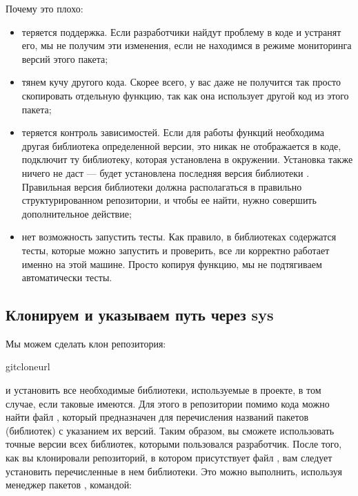 \documentclass[letterpaper,10pt,russian]{sphinxmanual}
\begin{document}
\sphinxAtStartPar
Почему это плохо:
\begin{itemize}
\item {} 
\sphinxAtStartPar
теряется поддержка. Если разработчики найдут проблему в коде и устранят его, мы не получим эти изменения, если не находимся в режиме мониторинга версий этого пакета;

\item {} 
\sphinxAtStartPar
тянем кучу другого кода. Скорее всего, у вас даже не получится так просто скопировать отдельную функцию, так как она использует другой код из этого пакета;

\item {} 
\sphinxAtStartPar
теряется контроль зависимостей. Если для работы функций необходима другая библиотека определенной версии, это никак не отображается в коде,  подключит ту библиотеку, которая установлена в окружении. Установка  также ничего не даст — будет установлена последняя версия библиотеки . Правильная версия библиотеки должна располагаться в правильно структурированном репозитории, и чтобы ее найти, нужно совершить дополнительное действие;

\item {} 
\sphinxAtStartPar
нет возможность запустить тесты. Как правило, в библиотеках содержатся тесты, которые можно запустить и проверить, все ли корректно работает именно на этой машине. Просто копируя функцию, мы не подтягиваем автоматически тесты.

\end{itemize}


\subsection{Клонируем и указываем путь через sys}
\label{\detokenize{educational_materials/packaging/content:sys}}
\sphinxAtStartPar
Мы можем сделать клон репозитория:

\begin{sphinxVerbatim}[commandchars=\\\{\}]
gitcloneurl
\end{sphinxVerbatim}

\sphinxAtStartPar
и установить все необходимые библиотеки, используемые в проекте, в том случае, если таковые имеются. Для этого в репозитории помимо кода можно найти файл , который предназначен для перечисления названий пакетов (библиотек) с указанием их версий. Таким образом, вы сможете использовать точные версии всех библиотек, которыми пользовался разработчик. После того, как вы клонировали репозиторий, в котором присутствует файл , вам следует установить перечисленные в нем библиотеки. Это можно выполнить, используя менеджер пакетов , командой:
\end{document}
